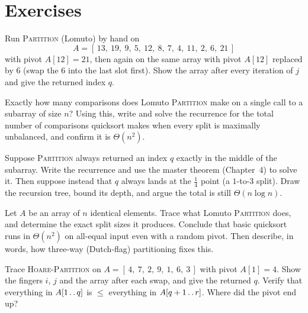 \section{Exercises}

\begin{exercise}
Run \textsc{Partition} (Lomuto) by hand on
\[
A = [\,13,\ 19,\ 9,\ 5,\ 12,\ 8,\ 7,\ 4,\ 11,\ 2,\ 6,\ 21\,]
\]
with pivot $A[12] = 21$, then again on the same array
with pivot $A[12]$ replaced by $6$ (swap the $6$ into the last slot first). Show
the array after every iteration of $j$ and give the returned index $q$.
\end{exercise}

\begin{exercise}
Exactly how many comparisons does Lomuto \textsc{Partition} make on a single call
to a subarray of size $n$? Using this, write and solve the recurrence for the
total number of comparisons quicksort makes when every split is maximally
unbalanced, and confirm it is $\Theta(n^2)$.
\end{exercise}

\begin{exercise}
Suppose \textsc{Partition} always returned an index $q$ exactly in the middle of
the subarray. Write the recurrence and use the master theorem (Chapter~4) to
solve it. Then suppose instead that $q$ always lands at the $\frac{1}{4}$ point
(a $1$-to-$3$ split). Draw the recursion tree, bound its depth, and argue the
total is still $\Theta(n \log n)$.
\end{exercise}

\begin{exercise}
Let $A$ be an array of $n$ identical elements. Trace what Lomuto
\textsc{Partition} does, and determine the exact split sizes it produces. Conclude
that basic quicksort runs in $\Theta(n^2)$ on all-equal input even with a random
pivot. Then describe, in words, how three-way (Dutch-flag) partitioning fixes
this.
\end{exercise}

\begin{exercise}
Trace \textsc{Hoare-Partition} on $A = [\,4,\ 7,\ 2,\ 9,\ 1,\ 6,\ 3\,]$ with
pivot $A[1]=4$. Show the fingers $i$, $j$ and the array after each swap, and give
the returned $q$. Verify that everything in $A[1 \mathinner{\ldotp\ldotp} q]$ is $\le$ everything in
$A[q+1 \mathinner{\ldotp\ldotp} r]$. Where did the pivot end up?
\end{exercise}

